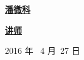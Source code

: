 \begin{flushleft}
	{\kaishu\underline{\hspace{1.8cm}\textbf{潘微科}\hspace{3.5cm}} }                         \\
	\vspace{10bp}
	
	{\kaishu\underline{\hspace{3.2cm}\textbf{讲师}\hspace{3.8cm}} }                         \\
	
\end{flushleft}

\vskip 4cm

\centerline{ 2016 年 \  4 月\  27 日}